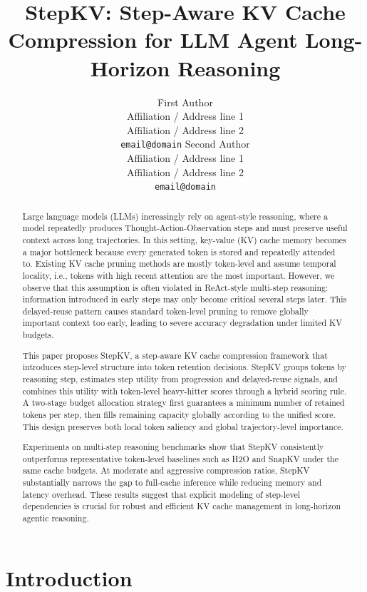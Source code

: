 \documentclass[11pt]{article}
\title{StepKV: Step-Aware KV Cache Compression for LLM Agent Long-Horizon Reasoning}
\author{
First Author \\
Affiliation / Address line 1 \\
Affiliation / Address line 2 \\
\texttt{email@domain}
\And
Second Author \\
Affiliation / Address line 1 \\
Affiliation / Address line 2 \\
\texttt{email@domain}
}
\begin{document}
\maketitle

\begin{abstract}
Large language models (LLMs) increasingly rely on agent-style reasoning, where a model repeatedly produces Thought-Action-Observation steps and must preserve useful context across long trajectories. In this setting, key-value (KV) cache memory becomes a major bottleneck because every generated token is stored and repeatedly attended to. Existing KV cache pruning methods are mostly token-level and assume temporal locality, i.e., tokens with high recent attention are the most important. However, we observe that this assumption is often violated in ReAct-style multi-step reasoning: information introduced in early steps may only become critical several steps later. This delayed-reuse pattern causes standard token-level pruning to remove globally important context too early, leading to severe accuracy degradation under limited KV budgets.

This paper proposes StepKV, a step-aware KV cache compression framework that introduces step-level structure into token retention decisions. StepKV groups tokens by reasoning step, estimates step utility from progression and delayed-reuse signals, and combines this utility with token-level heavy-hitter scores through a hybrid scoring rule. A two-stage budget allocation strategy first guarantees a minimum number of retained tokens per step, then fills remaining capacity globally according to the unified score. This design preserves both local token saliency and global trajectory-level importance.

Experiments on multi-step reasoning benchmarks show that StepKV consistently outperforms representative token-level baselines such as H2O and SnapKV under the same cache budgets. At moderate and aggressive compression ratios, StepKV substantially narrows the gap to full-cache inference while reducing memory and latency overhead. These results suggest that explicit modeling of step-level dependencies is crucial for robust and efficient KV cache management in long-horizon agentic reasoning.
\end{abstract}

\section{Introduction}
\end{document}
